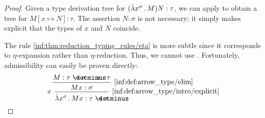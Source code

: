 \begin{proof}
  Given a type derivation tree for \( (\qabs {x^\sigma} M) N: \tau \), we can apply  to obtain a tree for \( M[x \mapsto N]: \tau \). The assertion \( N: \sigma \) is not necessary; it simply makes explicit that the types of \( x \) and \( N \) coincide.

  The rule \ref{inf:thm:reduction_typing_rules/eta} is more subtle since it corresponds to \( \eta \)-expansion rather than \( \eta \)-reduction. Thus, we cannot use . Fortunately, admissibility can easily be proven directly:
  \begin{equation*}
    \begin{prooftree}
      \hypo{ M: \tau \synimplies \sigma }
      \hypo{ x: \tau }
      \infer2[\ref{inf:def:arrow_type/elim}]{ Mx: \sigma }

      \infer[left label=\( x \)]1[\ref{inf:def:arrow_type/intro/explicit}]{ \qabs {x^\sigma} Mx: \tau \synimplies \sigma }
    \end{prooftree}
  \end{equation*}
\end{proof}

